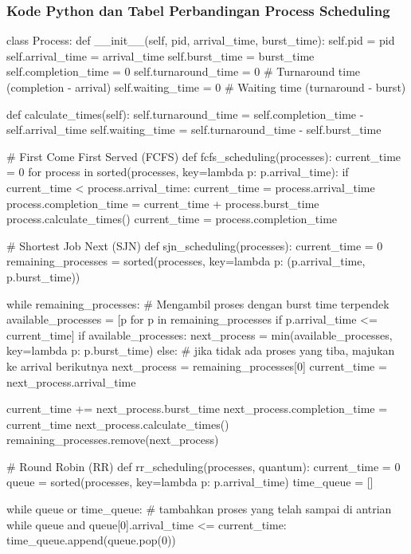 \documentclass[12pt]{article}
\begin{document}
\subsubsection{Kode Python dan Tabel Perbandingan Process Scheduling}
\begin{python}
    class Process:
    def __init__(self, pid, arrival_time, burst_time):
        self.pid = pid  
        self.arrival_time = arrival_time  
        self.burst_time = burst_time  
        self.completion_time = 0  
        self.turnaround_time = 0  # Turnaround time (completion - arrival)
        self.waiting_time = 0  # Waiting time (turnaround - burst)

    def calculate_times(self):
        self.turnaround_time = self.completion_time - self.arrival_time
        self.waiting_time = self.turnaround_time - self.burst_time

# First Come First Served (FCFS)
def fcfs_scheduling(processes):
    current_time = 0
    for process in sorted(processes, key=lambda p: p.arrival_time):
        if current_time < process.arrival_time:
            current_time = process.arrival_time  
        process.completion_time = current_time + process.burst_time
        process.calculate_times()
        current_time = process.completion_time

# Shortest Job Next (SJN)
def sjn_scheduling(processes):
    current_time = 0
    remaining_processes = sorted(processes, key=lambda p: (p.arrival_time, p.burst_time))

    while remaining_processes:
        # Mengambil proses dengan burst time terpendek
        available_processes = [p for p in remaining_processes if p.arrival_time <= current_time]
        if available_processes:
            next_process = min(available_processes, key=lambda p: p.burst_time)
        else:
            # jika tidak ada proses yang tiba, majukan ke arrival berikutnya
            next_process = remaining_processes[0]
            current_time = next_process.arrival_time

        current_time += next_process.burst_time
        next_process.completion_time = current_time
        next_process.calculate_times()
        remaining_processes.remove(next_process)

# Round Robin (RR) 
def rr_scheduling(processes, quantum):
    current_time = 0
    queue = sorted(processes, key=lambda p: p.arrival_time)
    time_queue = []

    while queue or time_queue:
        # tambahkan proses yang telah sampai di antrian
        while queue and queue[0].arrival_time <= current_time:
            time_queue.append(queue.pop(0))
        

\end{python}
\end{document}
